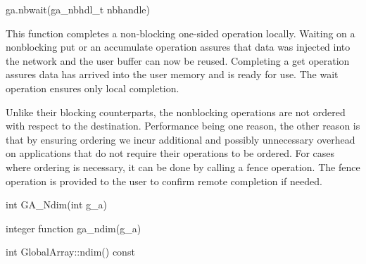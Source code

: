 \documentclass[12pt]{article}
\begin{document}
\begin{pyapi}
\begin{pycode}
ga.nbwait(ga_nbhdl_t nbhandle)
\end{pycode}
\end{pyapi}

\ncoll

\begin{desc}
This function completes a non-blocking one-sided operation locally. Waiting on
a nonblocking put or an accumulate operation assures that data was injected
into the network and the user buffer can now be reused. Completing a get
operation assures data has arrived into the user memory and is ready for use.
The wait operation ensures only local completion.

Unlike their blocking counterparts, the nonblocking operations are not ordered
with respect to the destination. Performance being one reason, the other reason
is that by ensuring ordering we incur additional and possibly unnecessary
overhead on applications that do not require their operations to be ordered.
For cases where ordering is necessary, it can be done by calling a fence
operation. The fence operation is provided to the user to confirm remote
completion if needed.
\end{desc}



\begin{capi}
\begin{ccode}
int GA_Ndim(int g_a)
\end{ccode}
\begin{funcargs}
\end{funcargs}
\end{capi}

\begin{fapi}
\begin{fcode}
integer function ga_ndim(g_a)
\end{fcode}
\begin{funcargs}
\end{funcargs}
\end{fapi}

\begin{cxxapi}
\begin{cxxcode}
int GlobalArray::ndim() const
\end{cxxcode}
\end{cxxapi}
\end{document}
